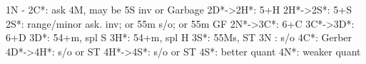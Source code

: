 1N -
2C*: ask 4M, may be 5S inv or Garbage
2D*->2H*: 5+H
2H*->2S*: 5+S
2S*: range/minor ask. inv; or 55m s/o; or 55m GF
2N*->3C*: 6+C
3C*->3D*: 6+D
3D*: 54+m, spl S
3H*: 54+m, spl H
3S*: 55Ms, ST
3N : s/o
4C*: Gerber
4D*->4H*: s/o or ST
4H*->4S*: s/o or ST
4S*: better quant
4N*: weaker quant
